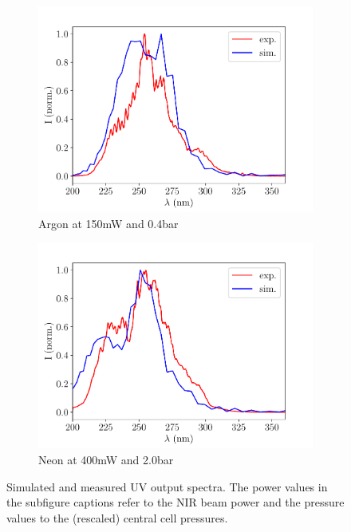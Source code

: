 \documentclass[a4paper]{jpconf}
\begin{document}
\begin{figure}[h]
\centering
 \begin{subfigure}{0.5\textwidth}
\includegraphics[width=\textwidth]{im/spec_comp_Ar_150mw_2.5scale_0.4bar}
\caption{Argon at 150mW and 0.4bar}\label{im:spec_Ar}
\end{subfigure}
 \begin{subfigure}{0.5\textwidth}
\includegraphics[width=\textwidth]{im/spec_comp_Ne_400mw_2.5scale_2.0bar}
\caption{Neon at 400mW and 2.0bar}\label{im:spec_Ne}
\end{subfigure}
\caption{Simulated and measured UV output spectra. The power values in the subfigure captions refer to the NIR beam power and the pressure values to the (rescaled) central cell pressures.}\label{im:spec}
\end{figure}
\end{document}
